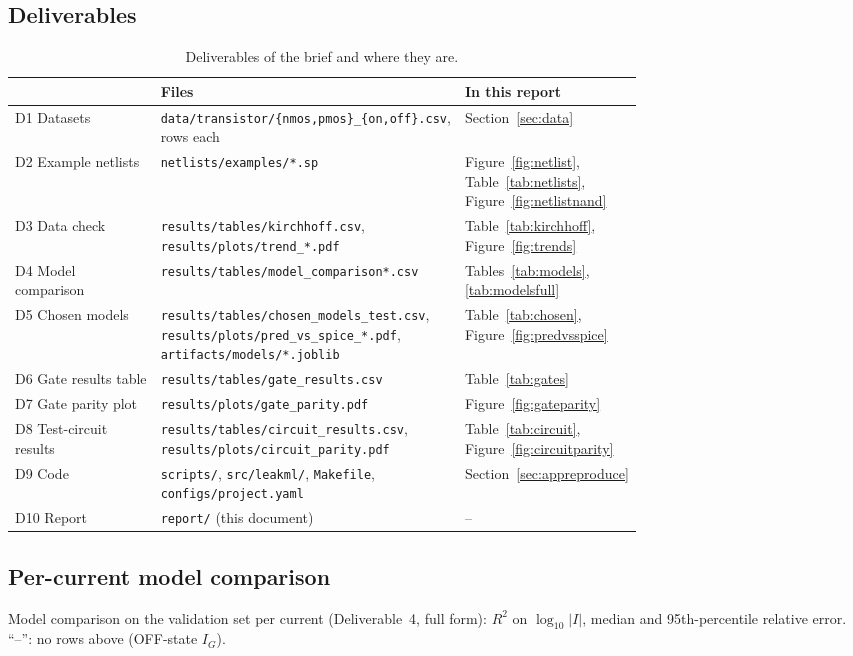 \subsection{Deliverables}
\begin{table}[H]
  \centering
  \small
  \caption{Deliverables of the brief and where they are.}
  \label{tab:deliverables}
  \begin{tabular}{@{}l>{\raggedright\arraybackslash}p{0.45\linewidth}>{\raggedright\arraybackslash}p{0.28\linewidth}@{}}
    \toprule
    & Files & In this report \\
    \midrule
    D1 Datasets & \texttt{data/transistor/\{nmos,pmos\}\_\{on,off\}.csv}, \RowsPerCase{} rows each &
      Section~\ref{sec:data} \\
    D2 Example netlists & \texttt{netlists/examples/*.sp} &
      Figure~\ref{fig:netlist}, Table~\ref{tab:netlists}, Figure~\ref{fig:netlistnand} \\
    D3 Data check & \texttt{results/tables/kirchhoff.csv}, \texttt{results/plots/trend\_*.pdf} &
      Table~\ref{tab:kirchhoff}, Figure~\ref{fig:trends} \\
    D4 Model comparison & \texttt{results/tables/model\_comparison*.csv} &
      Tables~\ref{tab:models}, \ref{tab:modelsfull} \\
    D5 Chosen models & \texttt{results/tables/chosen\_models\_test.csv},
      \texttt{results/plots/pred\_vs\_spice\_*.pdf}, \texttt{artifacts/models/*.joblib} &
      Table~\ref{tab:chosen}, Figure~\ref{fig:predvsspice} \\
    D6 Gate results table & \texttt{results/tables/gate\_results.csv} & Table~\ref{tab:gates} \\
    D7 Gate parity plot & \texttt{results/plots/gate\_parity.pdf} & Figure~\ref{fig:gateparity} \\
    D8 Test-circuit results & \texttt{results/tables/circuit\_results.csv},
      \texttt{results/plots/circuit\_parity.pdf} &
      Table~\ref{tab:circuit}, Figure~\ref{fig:circuitparity} \\
    D9 Code & \texttt{scripts/}, \texttt{src/leakml/}, \texttt{Makefile},
      \texttt{configs/project.yaml} & Section~\ref{sec:appreproduce} \\
    D10 Report & \texttt{report/} (this document) & -- \\
    \bottomrule
  \end{tabular}
\end{table}

\subsection{Per-current model comparison}
\begin{table}[H]
  \centering
  \scriptsize
  \setlength{\tabcolsep}{3pt}
  \caption{Model comparison on the validation set per current (Deliverable~4, full form):
  $R^2$ on $\log_{10}|I|$, median and 95th-percentile relative error. ``--'': no rows above
  \IFloor{} (OFF-state $I_G$).}
  \label{tab:modelsfull}
  \fittable{}
\end{table}
